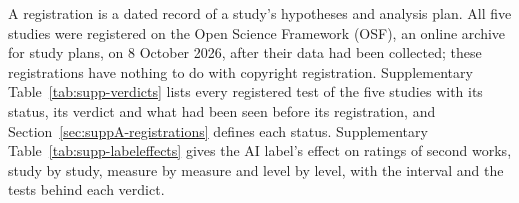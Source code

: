 A registration is a dated record of a study's hypotheses and analysis plan. All five studies were registered on the Open Science Framework (OSF), an online archive for study plans, on 8 October 2026, after their data had been collected; these registrations have nothing to do with copyright registration. Supplementary Table~\ref{tab:supp-verdicts} lists every registered test of the five studies with its status, its verdict and what had been seen before its registration, and Section~\ref{sec:suppA-registrations} defines each status. Supplementary Table~\ref{tab:supp-labeleffects} gives the AI label's effect on ratings of second works, study by study, measure by measure and level by level, with the interval and the tests behind each verdict.
